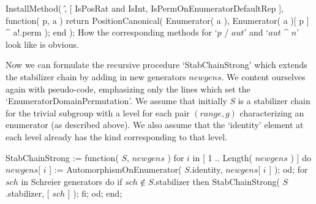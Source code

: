 \begintt
InstallMethod( \^,
        [ IsPosRat and IsInt, IsPermOnEnumeratorDefaultRep ],
    function( p, a )
    return PositionCanonical( Enumerator( a ),
                   Enumerator( a )[ p ] ^ a!.perm );
end );
\endtt
How the corresponding  methods for `$p$ /  $aut$' and `$aut$  ^ $n$' look
like is obvious.

Now we  can  formulate  the recursive procedure   `StabChainStrong' which
extends  the stabilizer chain by adding  in new  generators $newgens$. We
content  ourselves again   with pseudo-code, emphasizing  only  the lines
which set the `EnumeratorDomainPermutation'. We assume that initially $S$
is a stabilizer chain for the trivial subgroup with a level for each pair
$(range,g)$ characterizing an enumerator  (as  described above). We  also
assume that  the `identity'  element at each  level already  has the kind
corresponding to that level.

StabChainStrong := function( $S$, $newgens$ )
\quad for $i$  in [ 1 .. Length( $newgens$ ) ]  do
\qquad $newgens$[ $i$ ] := %
  AutomorphismOnEnumerator( $S$.identity, $newgens$[ $i$ ] );
\quad od;
\quad for $sch$  in {\rm Schreier generators}  do
\qquad if $sch \notin S$.stabilizer  then
\qquad\quad StabChainStrong( $S$.stabilizer, [ $sch$ ] );
\qquad fi;
\quad od;
end;

